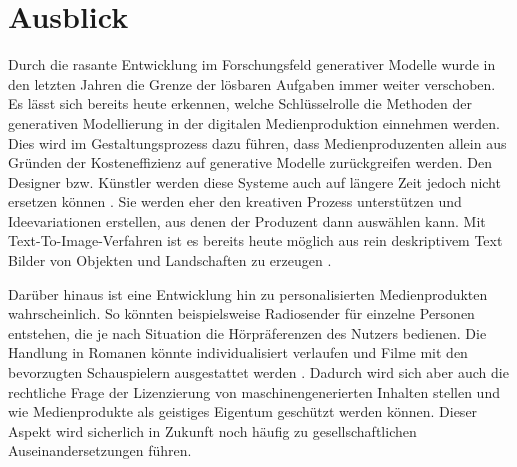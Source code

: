 \section{Ausblick}\label{ausblick}

Durch die rasante Entwicklung im Forschungsfeld generativer Modelle wurde in den letzten Jahren die Grenze der lösbaren Aufgaben immer weiter verschoben. Es lässt sich bereits heute erkennen, welche Schlüsselrolle die Methoden der generativen Modellierung in der digitalen Medienproduktion einnehmen werden. Dies wird im Gestaltungsprozess dazu führen, dass Medienproduzenten allein aus Gründen der Kosteneffizienz auf generative Modelle zurückgreifen werden. Den Designer bzw. Künstler werden diese Systeme auch auf längere Zeit jedoch nicht ersetzen können \cite{bcon18}. Sie werden eher den kreativen Prozess unterstützen und Ideevariationen erstellen, aus denen der Produzent dann auswählen kann. Mit {Text-To-Image}-Verfahren ist es bereits heute möglich aus rein deskriptivem Text Bilder von Objekten und Landschaften zu erzeugen \cite{zha17}.

Darüber hinaus ist eine Entwicklung hin zu personalisierten Medienprodukten wahrscheinlich. So könnten beispielsweise Radiosender für einzelne Personen entstehen, die je nach Situation die Hörpräferenzen des Nutzers bedienen. Die Handlung in Romanen könnte individualisiert verlaufen und Filme mit den bevorzugten Schauspielern ausgestattet werden \cite[S.283]{fos19}.
Dadurch wird sich aber auch die rechtliche Frage der Lizenzierung von maschinengenerierten Inhalten stellen und wie Medienprodukte als geistiges Eigentum geschützt werden können. Dieser Aspekt wird sicherlich in Zukunft noch häufig zu gesellschaftlichen Auseinandersetzungen führen.

